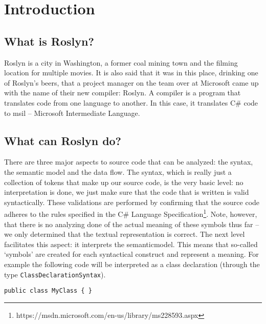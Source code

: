 \chapter{Introduction}
\label{ch:introduction}

\section{What is Roslyn?}
\label{sec:intro-what?}

Roslyn is a city in Washington, a former coal mining town and the filming location for multiple movies. It is also said that it was in this place, drinking one of Roslyn's beers, that a project manager on the  team over at Microsoft came up with the name of their new \gls{compiler}: Roslyn.\parencite{Wischik2014} A compiler is a program that translates code from one language to another. In this case, it translates C\# code to \gls{msil} -- Microsoft Intermediate Language.


\section{What can Roslyn do?}
\label{sec:intro-what-can}

There are three major aspects to source code that can be analyzed: the syntax, the semantic model and the data flow. 
The \gls{syntax}, which is really just a collection of tokens that make up our source code, is the very basic level: no interpretation is done, we just make sure that the code that is written is valid syntactically. These validations are performed by confirming that the source code adheres to the rules specified in the C\# Language Specification\footnote{https://msdn.microsoft.com/en-us/library/ms228593.aspx}. Note, however, that there is no analyzing done of the actual meaning of these symbols thus far – we only determined that the textual representation is correct.
The next level facilitates this aspect: it interprets the \gls{semanticmodel}. This means that so-called ‘symbols’ are created for each syntactical construct and represent a meaning. For example the following code will be interpreted as a class declaration (through the type \texttt{ClassDeclarationSyntax}).

\begin{lstlisting}
public class MyClass { }
\end{lstlisting}

